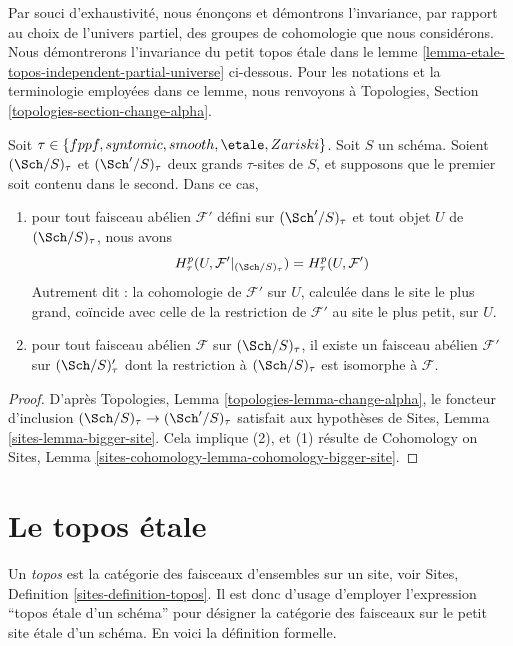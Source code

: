 \noindent
Par souci d'exhaustivit\'e, nous \'enon\c{c}ons et d\'emontrons l'invariance, par rapport au choix de l'univers
partiel, des groupes de cohomologie que nous consid\'erons. Nous d\'emontrerons l'invariance
du petit topos \'etale dans le
lemme \ref{lemma-etale-topos-independent-partial-universe} ci-dessous.
Pour les notations et la terminologie employ\'ees dans ce lemme, nous renvoyons \`a
Topologies, Section \ref{topologies-section-change-alpha}.

\begin{lemma}
\label{lemma-cohomology-enlarge-partial-universe}
Soit $\tau \in \{fppf, syntomic, smooth, \etale, Zariski\}$.
Soit $S$ un sch\'ema.
Soient $(\Sch/S)_\tau$ et $(\Sch'/S)_\tau$ deux
grands $\tau$-sites de $S$, et supposons que le premier soit contenu dans le second.
Dans ce cas,
\begin{enumerate}
\item pour tout faisceau ab\'elien $\mathcal{F}'$ d\'efini sur $(\Sch'/S)_\tau$ et
tout objet $U$ de $(\Sch/S)_\tau$, nous avons
$$
H^p_\tau(U, \mathcal{F}'|_{(\Sch/S)_\tau}) =
H^p_\tau(U, \mathcal{F}')
$$
Autrement dit : la cohomologie de $\mathcal{F}'$ sur $U$, calcul\'ee dans le site le plus grand,
co\"incide avec celle de la restriction de $\mathcal{F}'$ au site le plus petit,
sur $U$.
\item pour tout faisceau ab\'elien $\mathcal{F}$ sur $(\Sch/S)_\tau$, il existe un
faisceau ab\'elien $\mathcal{F}'$ sur $(\Sch/S)_\tau'$ dont la restriction \`a
$(\Sch/S)_\tau$ est isomorphe \`a $\mathcal{F}$.
\end{enumerate}
\end{lemma}

\begin{proof}
D'apr\`es Topologies, Lemma \ref{topologies-lemma-change-alpha}, le foncteur d'inclusion
$(\Sch/S)_\tau \to (\Sch'/S)_\tau$ satisfait aux hypoth\`eses de
Sites, Lemma \ref{sites-lemma-bigger-site}. Cela implique (2), et (1)
r\'esulte de
Cohomology on Sites, Lemma \ref{sites-cohomology-lemma-cohomology-bigger-site}.
\end{proof}




\section{Le topos \'etale}
\label{section-etale-topos}

\noindent
Un {\it topos} est la cat\'egorie des faisceaux d'ensembles sur un site, voir
Sites, Definition \ref{sites-definition-topos}. Il est donc d'usage
d'employer l'expression ``topos \'etale d'un sch\'ema'' pour d\'esigner
la cat\'egorie des faisceaux sur le petit site \'etale d'un sch\'ema.
En voici la d\'efinition formelle.

